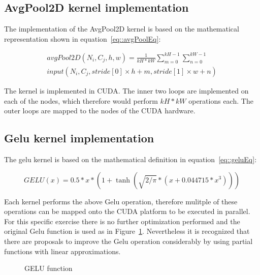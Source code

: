 \documentclass[letterpaper]{article}
\begin{document}
\subsection{AvgPool2D kernel implementation}
The implementation of the AvgPool2D kernel is based on the mathematical representation shown in equation~\ref{eq::avgPoolEq}:

\begin{equation}
\begin{aligned}
\label{eq::avgPoolEq} 
avgPool2D(N_i, C_j, h, w)  =  \frac{1}{kH * kW}  \sum_{m=0}^{kH-1} \sum_{n=0}^{kW-1} \\
                               input(N_i, C_j, stride[0] \times h + m, stride[1] \times w + n)
\end{aligned}
\end{equation}


The kernel is implemented in CUDA. The inner two loops are implemented on each of the nodes, which therefore would perform \(kH *kW\) operations each. The outer loops are mapped to the nodes of the CUDA hardware.  

\subsection{Gelu kernel implementation}

The gelu kernel is based on the mathematical definition in equation~\ref{eq::geluEq}:  

\begin{equation}
\label{eq::geluEq} 
GELU(x) = 0.5 * x * (1 + \tanh(\sqrt{2 / \pi} * (x + 0.044715 * x^3)))
\end{equation}



Each kernel performs the above Gelu operation, therefore mulitple of these operations can be mapped onto the CUDA platform to be executed in parallel. For this specific exercise there is no further optimization performed and the original Gelu function is used as in Figure~\ref{geluFunc}. Nevertheless it is recognized that there are proposals to improve the Gelu operation considerably by using partial functions with linear approximations. 

\begin{figure}
\caption{GELU function}
\label{geluFunc}
\end{figure}
\end{document}
